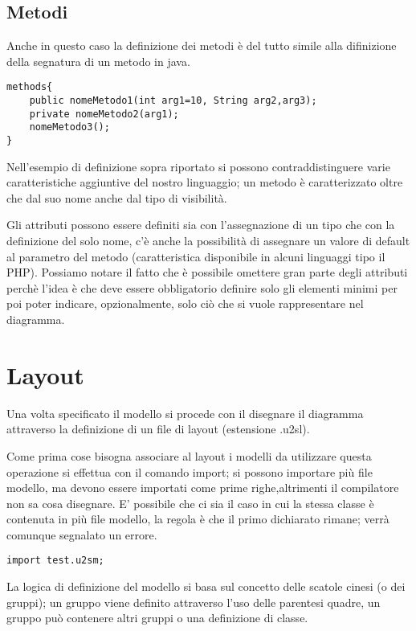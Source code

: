 \subsection{Metodi}

Anche in questo caso la definizione dei metodi è del tutto simile alla
difinizione della segnatura di un metodo in java.

\begin{lstlisting}[caption={Dichiarazione di metodi}, style={model}]
methods{
	public nomeMetodo1(int arg1=10, String arg2,arg3);
	private nomeMetodo2(arg1);
	nomeMetodo3();
}
\end{lstlisting}

Nell'esempio di definizione sopra riportato si possono contraddistinguere varie 
caratteristiche aggiuntive del nostro linguaggio; un metodo è caratterizzato
oltre che dal suo nome anche dal tipo di visibilità.

Gli attributi possono essere definiti sia con l'assegnazione di un tipo che con
la definizione del solo nome, c'è anche la possibilità di assegnare un valore di
default al parametro del metodo (caratteristica disponibile in alcuni linguaggi
tipo il PHP).
Possiamo notare il fatto che è possibile omettere gran parte degli attributi
perchè l'idea è che deve essere obbligatorio definire solo gli elementi minimi
per poi poter indicare, opzionalmente, solo ciò che si vuole rappresentare nel
diagramma. 


\section{Layout}


Una volta specificato il modello si procede con il disegnare il diagramma
attraverso la definizione di un file di layout (estensione .u2sl).

Come prima cose bisogna associare al layout i modelli da utilizzare questa
operazione si effettua con il comando import; si possono importare più file
modello, ma devono essere importati come prime righe,altrimenti il compilatore
non sa cosa disegnare. E' possibile che ci sia il caso in cui la stessa classe è
contenuta in più file modello, la regola è che il primo dichiarato rimane; verrà
comunque segnalato un errore.

\begin{lstlisting}[caption={Import dei modelli necessari}, style={layout}] 
import test.u2sm;
\end{lstlisting}

La logica di definizione del modello si basa sul concetto delle scatole cinesi (o
dei gruppi); un gruppo viene definito attraverso l'uso delle parentesi quadre,
un gruppo può contenere altri gruppi o una definizione di classe.

